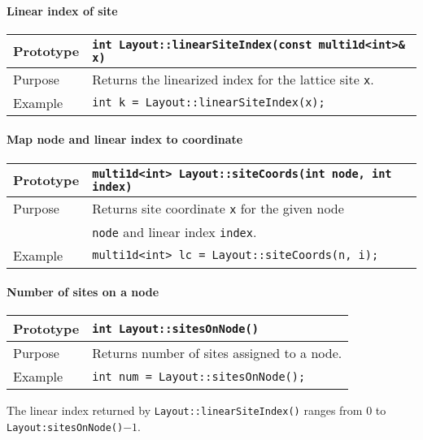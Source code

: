 \documentclass[12pt,letterpaper]{article}
\begin{document}
\paragraph{Linear index of site}

\begin{flushleft}
  \begin{tabular}{|l|l|}
  \hline
  Prototype      & \verb|int Layout::linearSiteIndex(const multi1d<int>& x)|\\
    \hline
  Purpose        & Returns the linearized index for the lattice site \verb|x|. \\
\hline
  Example  & \verb|int k = Layout::linearSiteIndex(x);| \\
   \hline
 \end{tabular}
\end{flushleft}

\paragraph{Map node and linear index to coordinate}

\begin{flushleft}
  \begin{tabular}{|l|l|}
  \hline
  Prototype      & \verb|multi1d<int> Layout::siteCoords(int node, int index)|\\
    \hline
  Purpose        & Returns site coordinate \verb|x| for the given node \\
                 & \verb|node| and linear index \verb|index|. \\
\hline
  Example  & \verb|multi1d<int> lc = Layout::siteCoords(n, i);| \\
   \hline
 \end{tabular}
\end{flushleft}

\paragraph{Number of sites on a node}

\begin{flushleft}
  \begin{tabular}{|l|l|}
  \hline
  Prototype      & \verb|int Layout::sitesOnNode()|\\
  \hline
  Purpose        & Returns number of sites assigned to a node.\\
  \hline
  Example        & \verb|int num = Layout::sitesOnNode();| \\
  \hline
 \end{tabular}
\end{flushleft}
%
The linear index returned by \verb|Layout::linearSiteIndex()| 
ranges from 0 to \verb|Layout:sitesOnNode()|$ - 1$.
\end{document}
